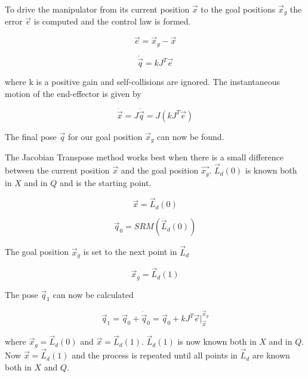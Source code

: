 To drive the manipulator from its current position $\vec{x}$ to the goal positions $\vec{x}_g$ the error $\vec{e}$ is computed and the control law is formed.

\begin{equation}
\vec{e} = \vec{x}_g - \vec{x}
\end{equation}

\begin{equation}
\dot{\vec{q}} = kJ^T\vec{e}
\end{equation}

where k is a positive gain and self-collisions are ignored.  The instantaneous motion of the end-effector is given by

\begin{equation}
\dot{\vec{x}} = J\dot{\vec{q}} = J(kJ^T\vec{e})
\end{equation}

The final pose $\vec{q}$ for our goal position $\vec{x}_g$ can now be found.

The Jacobian Transpose method works best when there is a small difference between the current position $\vec{x}$ and the goal position $\vec{x_g}$.  $\vec{L}_d(0)$ is known both in $X$ and in $Q$ and is the starting point.

\begin{equation}
\vec{x} = \vec{L}_d(0)
\end{equation}

\begin{equation}
\vec{q}_0 = SRM  \left( \vec{L}_d(0) \right)
\end{equation}

The goal position $\vec{x}_g$ is set to the next point in $\vec{L}_d$

\begin{equation}
\vec{x}_g = \vec{L}_d(1)
\end{equation}

The pose $\vec{q}_1$ can now be calculated

\begin{equation}
\vec{q}_1 = \vec{q}_0 + \dot{\vec{q}}_0 = \vec{q}_0 + kJ^T\vec{e}|_{\vec{x}}^{\vec{x}_g}
\end{equation}

where $\vec{x}_g = \vec{L}_d(0)$ and $\vec{x} = \vec{L}_d(1)$.  $\vec{L}_d(1)$ is now known both in $X$ and in $Q$.  Now $\vec{x} = \vec{L}_d(1)$ and the process is repeated until all points in $\vec{L}_d$ are known both in $X$ and $Q$.






